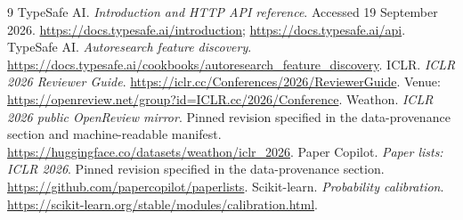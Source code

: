 \documentclass[11pt]{article}
\begin{document}
\begin{thebibliography}{9}
 TypeSafe AI. \emph{Introduction and HTTP API reference}. Accessed 19 September 2026. \url{https://docs.typesafe.ai/introduction}; \url{https://docs.typesafe.ai/api}.
 TypeSafe AI. \emph{Autoresearch feature discovery}. \url{https://docs.typesafe.ai/cookbooks/autoresearch_feature_discovery}.
 ICLR. \emph{ICLR 2026 Reviewer Guide}. \url{https://iclr.cc/Conferences/2026/ReviewerGuide}. Venue: \url{https://openreview.net/group?id=ICLR.cc/2026/Conference}.
 Weathon. \emph{ICLR 2026 public OpenReview mirror}. Pinned revision specified in the data-provenance section and machine-readable manifest. \url{https://huggingface.co/datasets/weathon/iclr_2026}.
 Paper Copilot. \emph{Paper lists: ICLR 2026}. Pinned revision specified in the data-provenance section. \url{https://github.com/papercopilot/paperlists}.
 Scikit-learn. \emph{Probability calibration}. \url{https://scikit-learn.org/stable/modules/calibration.html}.
\end{thebibliography}
\end{document}
